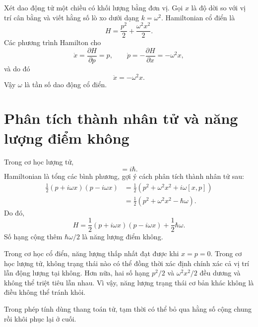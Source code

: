Xét dao động tử một chiều có khối lượng bằng đơn vị. Gọi \(x\) là độ dời so với vị trí cân bằng và viết hằng số lò xo dưới dạng \(k=\omega^2\). Hamiltonian cổ điển là
\begin{equation}
H=\frac{p^2}{2}+\frac{\omega^2x^2}{2}.
\end{equation}
Các phương trình Hamilton cho
\begin{equation}
\dot{x}=\frac{\partial H}{\partial p}=p,
\qquad
\dot{p}=-\frac{\partial H}{\partial x}=-\omega^2x,
\end{equation}
và do đó
\begin{equation}
\ddot{x}=-\omega^2x.
\end{equation}
Vậy \(\omega\) là tần số dao động cổ điển.

\section{Phân tích thành nhân tử và năng lượng điểm không}

Trong cơ học lượng tử,
\begin{equation}
[x,p]=i\hbar.
\end{equation}
Hamiltonian là tổng các bình phương, gợi ý cách phân tích thành nhân tử sau:
\begin{align}
\frac{1}{2}(p+i\omega x)(p-i\omega x)
&=\frac{1}{2}\left(p^2+\omega^2x^2+i\omega[x,p]\right) \\
&=\frac{1}{2}\left(p^2+\omega^2x^2-\hbar\omega\right).
\end{align}
Do đó,
\begin{equation}
H=\frac{1}{2}(p+i\omega x)(p-i\omega x)
+\frac{1}{2}\hbar\omega.
\end{equation}
Số hạng cộng thêm \(\hbar\omega/2\) là năng lượng điểm không.

Trong cơ học cổ điển, năng lượng thấp nhất đạt được khi \(x=p=0\). Trong cơ học lượng tử, không trạng thái nào có thể đồng thời xác định chính xác cả vị trí lẫn động lượng tại không. Hơn nữa, hai số hạng \(p^2/2\) và \(\omega^2x^2/2\) đều dương và không thể triệt tiêu lẫn nhau. Vì vậy, năng lượng trạng thái cơ bản khác không là điều không thể tránh khỏi.

Trong phép tính dùng thang toán tử, tạm thời có thể bỏ qua hằng số cộng chung rồi khôi phục lại ở cuối.

\begin{classroomqa}\end{classroomqa}

